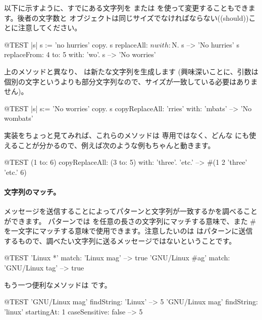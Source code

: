 \documentclass[a4paper,10pt,twoside]{book}
\begin{document}
以下に示すように、すでにある文字列を  または  を使って変更することもできます。後者の文字数と  オブジェクトは同じサイズでなければならない((should))ことに注意してください。

\begin{code}{@TEST |s| s := 'no hurries' copy.}
s replaceAll: $n with: $N.
s --> 'No hurries'
s replaceFrom: 4 to: 5 with: 'wo'.
s --> 'No worries'
\end{code}

上のメソッドと異なり、 は新たな文字列を生成します
(興味深いことに、引数は個別の文字というよりも部分文字列なので、サイズが一致している必要はありません)。

\begin{code}{@TEST |s| s:= 'No worries' copy.}
s copyReplaceAll: 'rries' with: 'mbats' --> 'No wombats'
\end{code}

実装をちょっと見てみれば、これらのメソッドは  専用ではなく、どんな  にも使えることが分かるので、例えば次のような例もちゃんと動きます。

\begin{code}{@TEST}
(1 to: 6) copyReplaceAll: (3 to: 5) with: { 'three'. 'etc.' } --> #(1 2 'three' 'etc.' 6)
\end{code}

\paragraph{文字列のマッチ。}
 メッセージを送信することによってパターンと文字列が一致するかを調べることができます。
パターンでは \ct{*} を任意の長さの文字列にマッチする意味で、また \# を一文字にマッチする意味で使用できます。注意したいのは  はパターンに送信するもので、調べたい文字列に送るメッセージではないということです。
\begin{code}{@TEST}
'Linux *' match: 'Linux mag'                      --> true
'GNU/Linux #ag' match: 'GNU/Linux tag' --> true
\end{code}

もう一つ便利なメソッドは  です。
\begin{code}{@TEST}
'GNU/Linux mag' findString: 'Linux'                                                      --> 5
'GNU/Linux mag' findString: 'linux' startingAt: 1 caseSensitive: false  --> 5
\end{code}
\end{document}
